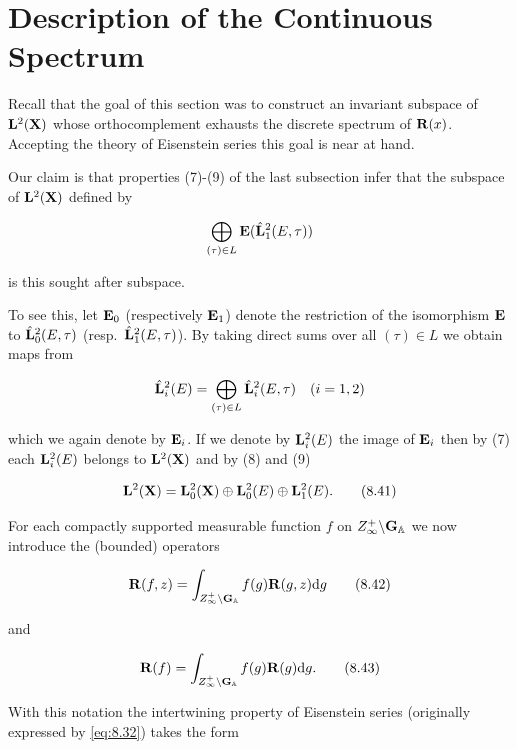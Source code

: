 \section{Description of the Continuous Spectrum}\label{sec:8d}

Recall that the goal of this section was to construct an invariant subspace of $\mathbf{L}^{2}(\mathbf{X})$ whose orthocomplement exhausts the discrete spectrum of $\mathbf{R}(x)$. Accepting the theory of Eisenstein series this goal is near at hand.

Our claim is that properties (7)-(9) of the last subsection infer that the subspace of $\mathbf{L}^{2}(\mathbf{X})$ defined by

\[
\bigoplus_{(\tau) \in L} \mathbf{E}(\hat{\mathbf{L}}_{1}^{2}(E,\tau))
\]

is this sought after subspace.

To see this, let $\mathbf{E}_{0}$ (respectively $\mathbf{E}_{1}$) denote the restriction of the isomorphism $\mathbf{E}$ to $\hat{\mathbf{L}}_{0}^{2}(E,\tau)$ (resp.\ $\hat{\mathbf{L}}_{1}^{2}(E,\tau)$). By taking direct sums over all $(\tau) \in L$ we obtain maps from

\[
\hat{\mathbf{L}}_{i}^{2}(E) = \bigoplus_{(\tau) \in L} \hat{\mathbf{L}}_{i}^{2}(E,\tau) \quad (i = 1,2)
\]

which we again denote by $\mathbf{E}_{i}$. If we denote by $\mathbf{L}_{i}^{2}(E)$ the image of $\mathbf{E}_{i}$ then by (7) each $\mathbf{L}_{i}^{2}(E)$ belongs to $\mathbf{L}^{2}(\mathbf{X})$ and by (8) and (9)

\begin{equation}\label{eq:8.41}
\mathbf{L}^{2}(\mathbf{X}) = \mathbf{L}_{0}^{2}(\mathbf{X}) \oplus \mathbf{L}_{0}^{2}(E) \oplus \mathbf{L}_{1}^{2}(E).\tag{8.41}
\end{equation}

For each compactly supported measurable function $f$ on $Z_{\infty}^{+}\backslash\mathbf{G}_{\mathbb{A}}$ we now introduce the (bounded) operators

\begin{equation}\label{eq:8.42}
\mathbf{R}(f,z) = \int_{Z_{\infty}^{+}\backslash\mathbf{G}_{\mathbb{A}}} f(g)\mathbf{R}(g,z) \mathrm{d} g\tag{8.42}
\end{equation}

and

\begin{equation}\label{eq:8.43}
\mathbf{R}(f) = \int_{Z_{\infty}^{+}\backslash\mathbf{G}_{\mathbb{A}}} f(g)\mathbf{R}(g) \mathrm{d} g.\tag{8.43}
\end{equation}

With this notation the intertwining property of Eisenstein series (originally expressed by \eqref{eq:8.32}) takes the form

